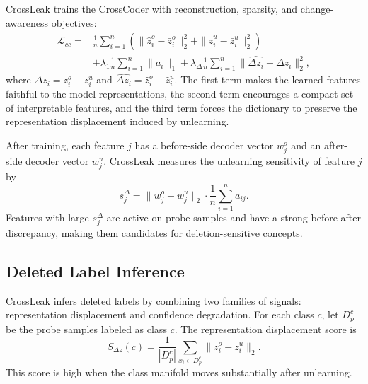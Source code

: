 CrossLeak trains the CrossCoder with reconstruction, sparsity, and change-awareness objectives:
\begin{equation}
\begin{aligned}
    \mathcal{L}_{cc}
    =& \frac{1}{n}\sum_{i=1}^{n}
    \left(
        \|\hat z_i^o-\bar z_i^o\|_2^2
        + \|\hat z_i^u-\bar z_i^u\|_2^2
    \right)  \\
    &+ \lambda_1 \frac{1}{n}\sum_{i=1}^{n}\|a_i\|_1
    + \lambda_{\Delta}\frac{1}{n}\sum_{i=1}^{n}
        \|\widehat{\Delta z_i} - \Delta z_i\|_2^2,
\end{aligned}
\label{eq:crosscoder_loss}
\end{equation}
where $\Delta z_i=\bar z_i^o-\bar z_i^u$ and $\widehat{\Delta z_i}=\hat z_i^o-\hat z_i^u$. The first term makes the learned features faithful to the model representations, the second term encourages a compact set of interpretable features, and the third term forces the dictionary to preserve the representation displacement induced by unlearning.

After training, each feature $j$ has a before-side decoder vector $w_j^o$ and an after-side decoder vector $w_j^u$. CrossLeak measures the unlearning sensitivity of feature $j$ by
\begin{equation}
    s_j^{\Delta} = \|w_j^o-w_j^u\|_2 \cdot
    \frac{1}{n}\sum_{i=1}^{n} a_{ij}.
    \label{eq:feature_delta_score}
\end{equation}
Features with large $s_j^{\Delta}$ are active on probe samples and have a strong before-after discrepancy, making them candidates for deletion-sensitive concepts.



\subsection{Deleted Label Inference}
\label{sec:approach_label_inference}

CrossLeak infers deleted labels by combining two families of signals: representation displacement and confidence degradation. For each class $c$, let $D_p^c$ be the probe samples labeled as class $c$. The representation displacement score is
\begin{equation}
    S_{\Delta z}(c)=
    \frac{1}{|D_p^c|}\sum_{x_i\in D_p^c}
    \|\bar z_i^o-\bar z_i^u\|_2.
    \label{eq:delta_z_score}
\end{equation}
This score is high when the class manifold moves substantially after unlearning.

